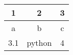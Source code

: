 \documentclass{article}
\begin{document}
\begin{center}
\begin{tabular}{ | c | c | c | }
\hline
1 & 2 & 3 \\ \hline
a & b & c \\ \hline
3.1 & python & 4 \\ \hline
\end{tabular}
\end{center}
\end{document}
